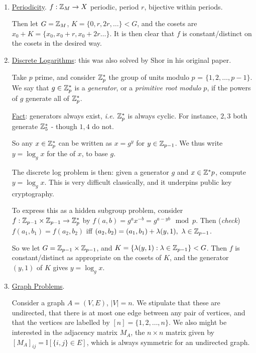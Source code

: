 \documentclass[]{article}
\renewcommand{\it}[1]{\textit{#1}}
\begin{document}
\begin{remark*}\ 
\begin{enumerate}[label = (\alph*)]
	\item \underline{Periodicity}. $f:\mathbb{Z}_M \rightarrow X$ periodic, period $r$, bijective within periods.
	
	Then let $G = \mathbb{Z}_M$, $K = \{0,r,2r,\dots\} < G$, and the cosets are $x_0 + K = \{x_0,x_0+r,x_0+2r\dots\}$. It is then clear that $f$ is constant/distinct on the cosets in the desired way.
	
	\item \underline{Discrete Logarithms}: this was also solved by Shor in his original paper.
	
	Take $p$ prime, and consider $\mathbb{Z}_p^\ast$ the group of units modulo $p$ = $\{1,2,\dots,p-1\}$. We say that $g\in \mathbb{Z}_p^\ast$ is a \it{generator}, or a \it{primitive root modulo} $p$, if the powers of $g$ generate all of $\mathbb{Z}_p^\ast$.
	
	\underline{Fact}: generators always exist, \it{i.e.} $\mathbb{Z}_p^\ast$ is always cyclic. For instance, $2,3$ both generate $\mathbb{Z}_5^\ast$ - though $1,4$ do not.
	
	So any $x\in \mathbb{Z}^\ast_p$ can be written as $x = g^y$ for $y \in \mathbb{Z}_{p-1}$. We thus write $y = \log_g x$ for the  of $x$, to base $g$.
	
	The discrete log problem is then: given a generator $g$ and $x\in \mathbb{Z}^\ast p$, compute $y = \log_g x$. This is very difficult classically, and it underpins public key cryptography.
	
	To express this as a hidden subgroup problem, consider $f:\mathbb{Z}_{p-1}\times\mathbb{Z}_{p-1}\rightarrow\mathbb{Z}_p^\ast$ by $f(a,b) = g^ax^{-b} = g^{a-yb} \mod p$. Then (\it{check}) $f(a_1,b_1) = f(a_2,b_2)$ iff $(a_2,b_2) = (a_1,b_1)+\lambda (y,1),\ \lambda \in \Z_{p-1}$.
	
	So we let $G = \mathbb{Z}_{p-1}\times\mathbb{Z}_{p-1}$, and $K = \{\lambda(y,1):\lambda \in \mathbb{Z}_{p-1}\} < G$. Then $f$ is constant/distinct as appropriate on the cosets of $K$, and the generator $(y,1)$ of $K$ gives $y = \log_g x$.
	
	\item \underline{Graph Problems}.
	
	Consider a graph $A = (V,E)$, $|V| = n$. We stipulate that these are undirected, that there is at most one edge between any pair of vertices, and that the vertices are labelled by $[n] = \{1,2,\dots,n\}$. We also might be interested in the adjacency matrix $M_A$, the $n\times n$ matrix given by $[M_A]_{ij} = \mathbb{I}[\{i,j\}\in E]$, which is always symmetric for an undirected graph.
	

\end{enumerate}
\end{remark*}
\end{document}
